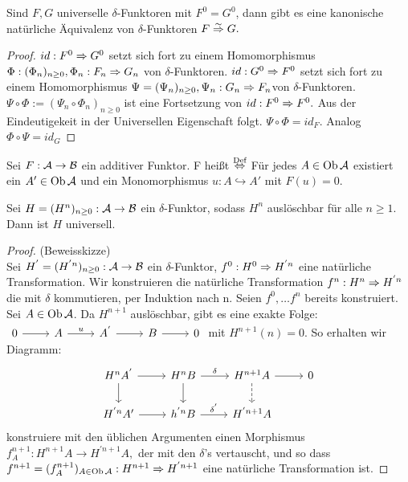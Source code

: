 \begin{bem}\label{9.4}
	Sind $F,G$ universelle $\delta$-Funktoren mit $F^{0} = G^{0}$, dann gibt es eine kanonische natürliche Äquivalenz von $\delta$-Funktoren $ F \overset{\sim}{\Rightarrow} G.$
\end{bem}
\begin{proof}
	$id: F^{0} \Rightarrow G^{0} $ setzt sich fort zu einem Homomorphismus $\Phi: (\Phi_n)_{n \geq 0}, \Phi_n: F_n \Rightarrow G_n $ von $\delta$-Funktoren. $id: G^{0} \Rightarrow F^{0} $ setzt sich fort zu einem Homomorphismus $\Psi = (\Psi_n)_{n \geq 0}, \Psi_n: G_n\Rightarrow F_n $von $\delta$-Funktoren. $\Psi \circ \Phi := (\Psi_n \circ \Phi_n)_{n \geq 0}$ ist eine Fortsetzung von $id: F^{0} \Rightarrow F^{0}.$ Aus der Eindeutigekeit in der Universellen Eigenschaft folgt. $\Psi \circ \Phi = id_F.$ Analog $ \Phi \circ \Psi = id_G$
\end{proof}
\begin{df}
	Sei $ F: \mathcal{A} \to \mathcal{B} $ ein additiver Funktor.  F heißt  $\overset{\text{Def}}{\Leftrightarrow} $ Für jedes $A \in \text{Ob}\,\mathcal{A} $ existiert ein $A' \in \text{Ob}\,\mathcal{A} $ und ein Monomorphismus $ u: A \hookrightarrow A'$ mit $ F(u)= 0 $. 
\end{df}
\begin{sa}\label{9.6}
	Sei $H=(H^n)_{n\geq 0}: \mathcal{A} \to \mathcal{B} $ ein $\delta$-Funktor, sodass $H^n $ auslöschbar für alle $ n \geq 1$. Dann ist $H$ universell. 
\end{sa}
\begin{proof}
	(Beweisskizze)\\
	Sei $H^{'}=(H^{'n})_{n\geq 0}: \mathcal{A} \to \mathcal{B} $ ein $\delta$-Funktor, $f^{0}: H^{0} \Rightarrow H^{'n}$ eine natürliche Transformation. Wir konstruieren die natürliche Transformation $f^n: H^n \Rightarrow H^{'n} $ die mit $\delta$ kommutieren, per Induktion nach n. Seien $f^{0},\dots f^{n}$ bereits konstruiert. Sei $A \in \text{Ob}\,\mathcal{A} $. Da $H^{n+1} $ auslöschbar, gibt es eine exakte Folge:\\ $\begin{tikzcd}
	0\arrow{r} & A \arrow{r}{u} & A^{'}\arrow{r} & B \arrow{r} & 0
	\end{tikzcd}$ mit $H^{n+1}(n) = 0$. So erhalten wir Diagramm: 
	$$\begin{tikzcd}
	H^{n}A^{'}\arrow{d} \arrow{r} & H^{n}B\arrow{r}{\delta} \arrow{d}& H^{n+1}A \arrow[dashed]{d} \arrow{r} & 0\\
	H^{'n}A' \arrow{r} & h^{'n}B\arrow{r}{\delta^{'}} & H^{'n+1}A
	\end{tikzcd} $$
	konstruiere mit den üblichen Argumenten einen Morphismus $f^{n+1}_A : H^{n+1}A \to H^{'n+1}A, $ der mit den $\delta$'s vertauscht, und so dass $f^{n+1} = (f^{n+1}_A)_{A \in \text{Ob}\,\mathcal{A}}:H^{n+1} \Rightarrow H^{'n+1} $ eine natürliche Transformation ist. 
\end{proof}
